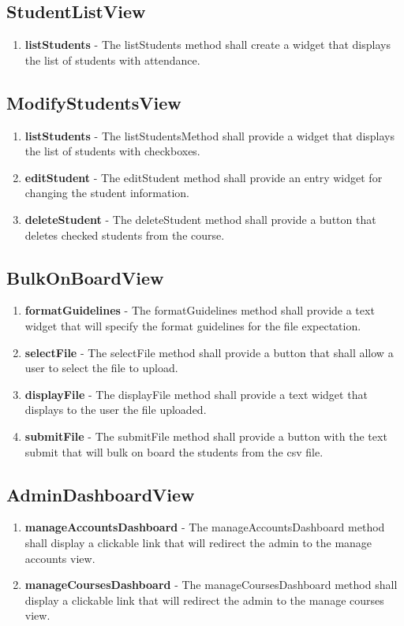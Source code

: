 \documentclass[letterpaper,12pt,oneside,listof=totoc]{scrreprt}
\begin{document}
\subsection{StudentListView}
\begin{enumerate}
    \item \textbf{listStudents} - The listStudents method shall create a widget that displays the list of students with attendance.
\end{enumerate}

\subsection{ModifyStudentsView} 
\begin{enumerate}
    \item \textbf{listStudents} - The listStudentsMethod shall provide a widget that displays the list of students with checkboxes.
    \item \textbf{editStudent} - The editStudent method shall provide an entry widget for changing the student information.
    \item \textbf{deleteStudent} - The deleteStudent method shall provide a button that deletes checked students from the course. 
\end{enumerate}

\subsection{BulkOnBoardView}
\begin{enumerate}
    \item \textbf{formatGuidelines} - The formatGuidelines method shall provide a text widget that will specify the format guidelines for the file expectation.
    \item \textbf{selectFile} - The selectFile method shall provide a button that shall allow a user to select the file to upload.
    \item \textbf{displayFile} - The displayFile method shall provide a text widget that displays to the user the file uploaded.
    \item \textbf{submitFile} - The submitFile method shall provide a button with the text submit that will bulk on board the students from the csv file.
\end{enumerate}

\subsection{AdminDashboardView}
\begin{enumerate}
    \item \textbf{manageAccountsDashboard} - The manageAccountsDashboard method shall display a clickable link that will redirect the admin to the manage accounts view.
    \item \textbf{manageCoursesDashboard} - The manageCoursesDashboard method shall display a clickable link that will redirect the admin to the manage courses view.
\end{enumerate}
\end{document}
